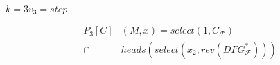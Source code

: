 \begin{minipage}[t]{6cm}
    $k=3$\quad$v_3=step$
    \begin{graybox}
        \setlength{\abovedisplayskip}{0pt}
        \setlength{\belowdisplayskip}{0pt}
        \vspace{-0.5em}
        \begin{align*}
            P_3[C]&(M,x)=select(1,C_\mathcal{F})\\
                \mathrel\cap{}&heads(select(x_2,rev(DFG_\mathcal{F}^*)))
        \end{align*}
    \end{graybox}
    \vspace{-0.75em}

    \phantom{\large $x=(9,17,22)$}
\end{minipage}
\hfill
